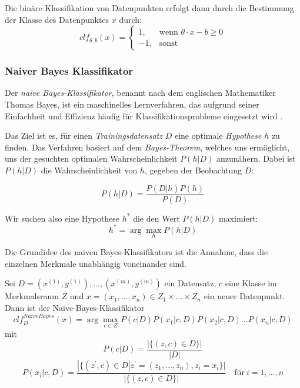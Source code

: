 \documentclass[researchlab,group,]{AIGpaper}
\begin{document}
Die binäre Klassifikation von Datenpunkten erfolgt dann durch die Bestimmung der Klasse des Datenpunktes $x$ durch:
\begin{equation*}
        clf_{\theta, b}(x) =
        \begin{cases}
        1, & \text{wenn } \theta \cdot x - b \geq 0 \\
        -1, & \text{sonst}
    \end{cases}
\end{equation*}


\subsubsection{Naiver Bayes Klassifikator}
Der \textit{naive Bayes-Klassifikator}, benannt nach dem englischen Mathematiker Thomas Bayes, ist ein maschinelles Lernverfahren, das aufgrund seiner Einfachheit und Effizienz häufig für Klassifikationsprobleme eingesetzt wird \cite{wankhade2022survey, medhat2014sentiment, zimbra2018state}.

Das Ziel ist es, für einen \textit{Trainingsdatensatz} $D$ eine optimale \textit{Hypothese} $h$ zu finden. Das Verfahren basiert auf dem \textit{Bayes-Theorem}, welches uns ermöglicht, uns der gesuchten optimalen Wahrscheinlichkeit $P(h|D)$ anzunähern. Dabei ist $P(h|D)$ die Wahrscheinlichkeit von $h$, gegeben der Beobachtung $D$:

\begin{equation*}
    P(h|D) = \frac{P(D|h)P(h)}{P(D)}
\end{equation*}

Wir suchen also eine Hypothese $h^*$ die den Wert $P(h|D)$ maximiert:
\begin{equation*}
    h^* = \arg\max_{h} P(h|D)
\end{equation*}

Die Grundidee des naiven Bayes-Klassifikators ist die Annahme, dass die einzelnen Merkmale unabhängig voneinander sind.

Sei $D = (x^{(1)}, y^{(1)}), \dots, (x^{(m)}, y^{(m)})$ ein Datensatz, $c$ eine Klasse im Merkmalsraum $Z$  und $x=(x_1, \dots,x_n)\in Z_1 \times \dots \times Z_n$ ein neuer Datenpunkt. Dann ist der Naive-Bayes-Klassifikator
\begin{equation*}
    clf_D^{NaiveBayes}(x) = \arg \max_{c\in Z} P(c|D)P(x_1|c,D)P(x_2|c,D) \dots P(x_n|c,D)
\end{equation*}
mit
\begin{equation*}
    P(c|D) = \frac{|\{(z,c)\in D\}|}{|D|}
\end{equation*}
\begin{equation*}
    P(x_i|c,D) = \frac{|\{(z^\prime,c)\in D| z^\prime = (z_1, \dots, z_n), z_i=x_i \}|}{|\{(z,c)\in D\}|} \quad \text{für} \: i = 1, \dots, n 
\end{equation*}
\end{document}
